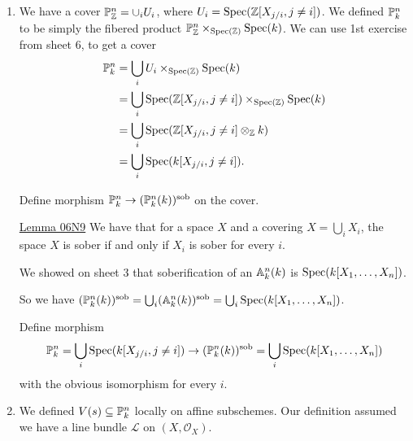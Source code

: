 \begin{exercise}{3}
    \begin{enumerate}
        \item{
            We have a cover $\mathbb{P}^n_{\mathbb{Z}} = \cup_i U_i$, where $U_i = \operatorname{Spec}(\mathbb{Z}[X_{j/i}, j
            \not= i])$. We defined $\mathbb{P}^n_k$ to be simply the fibered product
            $\mathbb{P}^n_{\mathbb{Z}} \times_{\operatorname{Spec}(\mathbb{Z})} \operatorname{Spec}(k)$. We can use 1st exercise from sheet
            6, to get a cover
            \begin{align*}
                \mathbb{P}^n_k &= \bigcup_i U_i \times_{\operatorname{Spec}(\mathbb{Z})} \operatorname{Spec}(k) \\
                &= \bigcup_i \operatorname{Spec}(\mathbb{Z}[X_{j/i}, j \not= i]) \times_{\operatorname{Spec}(\mathbb{Z})} \operatorname{Spec}(k) \\
                &= \bigcup_i \operatorname{Spec}(\mathbb{Z}[X_{j/i}, j \not= i] \otimes_{\mathbb{Z}} k) \\
                &= \bigcup_i \operatorname{Spec}(k[X_{j/i}, j \not= i]).
            \end{align*}

            Define morphism $\mathbb{P}^n_k \to (\mathbb{P}^n_k(k))^{\text{sob}}$ on the cover.


            \href{https://stacks.math.columbia.edu/tag/06N9}{Lemma 06N9}
            We have that for a space $X$ and a covering $X = \bigcup_i X_i$, the space
            $X$ is sober if and only if $X_i$ is sober for every $i$.

            We showed on sheet 3 that soberification of an $\mathbb{A}^n_k(k)$ is
            $\operatorname{Spec}(k[X_1, \dots, X_n])$.
            
            So we have $(\mathbb{P}^n_k(k))^{\text{sob}} = \bigcup_i (\mathbb{A}^n_k(k))^{\text{sob}}
            = \bigcup_i \operatorname{Spec}(k[X_1, \dots, X_n])$.

            Define morphism
            \begin{equation*}
                \mathbb{P}^n_k = \bigcup_i \operatorname{Spec}(k[X_{j/i}, j \not= i]) \to
                (\mathbb{P}^n_k(k))^{\text{sob}} = \bigcup_i \operatorname{Spec}(k[X_1, \dots, X_n])
            \end{equation*}
            with the obvious isomorphism for every $i$.
            }

        \item{
                We defined $V(s) \subseteq \mathbb{P}^n_k$ locally on affine
                subschemes. Our definition assumed we have a line bundle
                $\mathcal{L}$ on $(X, \mathcal{O}_X)$.

}
\end{enumerate}
\end{exercise}
